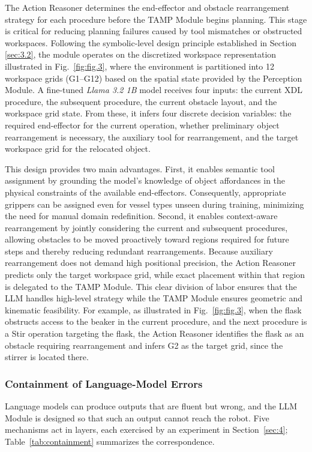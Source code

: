 \documentclass{ieeeaccess}
\newif\ifhighlight
\newcommand{\rev}[1]{\ifhighlight\hl{#1}\else#1\fi}
\begin{document}
The Action Reasoner determines the end-effector and obstacle rearrangement strategy for each procedure before the TAMP Module begins planning. This stage is critical for reducing planning failures caused by tool mismatches or obstructed workspaces. Following the symbolic-level design principle established in Section \ref{sec:3.2}, the module operates on the discretized workspace representation illustrated in Fig.~\ref{fig:fig.3}, where the environment is partitioned into 12 workspace grids (G1--G12) based on the spatial state provided by the Perception Module. A fine-tuned \textit{Llama 3.2 1B} model receives four inputs: the current XDL procedure, the subsequent procedure, the current obstacle layout, and the workspace grid state. From these, it infers four discrete decision variables: the required end-effector for the current operation, whether preliminary object rearrangement is necessary, the auxiliary tool for rearrangement, and the target workspace grid for the relocated object.

This design provides two main advantages. First, it enables semantic tool assignment by grounding the model's knowledge of object affordances in the physical constraints of the available end-effectors. Consequently, appropriate grippers can be assigned even for vessel types unseen during training, minimizing the need for manual domain redefinition. Second, it enables context-aware rearrangement by jointly considering the current and subsequent procedures, allowing obstacles to be moved proactively toward regions required for future steps and thereby reducing redundant rearrangements. Because auxiliary rearrangement does not demand high positional precision, the Action Reasoner predicts only the target workspace grid, while exact placement within that region is delegated to the TAMP Module. This clear division of labor ensures that the LLM handles high-level strategy while the TAMP Module ensures geometric and kinematic feasibility. For example, as illustrated in Fig.~\ref{fig:fig.3}, when the flask obstructs access to the beaker in the current procedure, and the next procedure is a Stir operation targeting the flask, the Action Reasoner identifies the flask as an obstacle requiring rearrangement and infers G2 as the target grid, since the stirrer is located there.

\subsubsection{Containment of Language-Model Errors}\label{sec:3.2.4}
\rev{Language models can produce outputs that are fluent but wrong, and the LLM Module is designed so that such an output cannot reach the robot.
Five mechanisms act in layers, each exercised by an experiment in Section~\ref{sec:4}; Table~\ref{tab:containment} summarizes the correspondence.}
\end{document}
